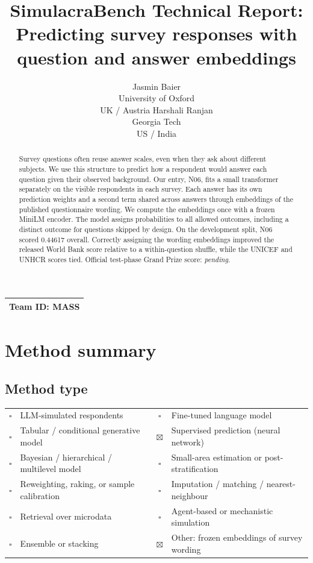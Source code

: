 \documentclass{article}
\title{SimulacraBench Technical Report:\\Predicting survey responses with\\question and answer embeddings}
\author{Jasmin Baier\\University of Oxford\\UK / Austria
\And Harshali Ranjan\\Georgia Tech\\US / India}
\newcommand{\teamid}{MASS}
\newcommand{\pending}{\textit{pending}}
\newcommand{\TestGrand}{\pending}
\newcommand{\yes}{$\boxtimes$}
\newcommand{\no}{$\square$}
\begin{document}
\maketitle
\begin{center}
\begin{tabular}{l}\toprule \textbf{Team ID:} \teamid\\\bottomrule\end{tabular}
\end{center}

\begin{abstract}
Survey questions often reuse answer scales, even when they ask about different subjects. We use this structure to predict how a respondent would answer each question given their observed background. Our entry, N06, fits a small transformer separately on the visible respondents in each survey. Each answer has its own prediction weights and a second term shared across answers through embeddings of the published questionnaire wording. We compute the embeddings once with a frozen MiniLM encoder. The model assigns probabilities to all allowed outcomes, including a distinct outcome for questions skipped by design. On the development split, N06 scored 0.44617 overall. Correctly assigning the wording embeddings improved the released World Bank score relative to a within-question shuffle, while the UNICEF and UNHCR scores tied. Official test-phase Grand Prize score: \TestGrand.
\end{abstract}

\section{Method summary}
\subsection{Method type}
\begin{center}\small
\begin{tabularx}{\linewidth}{@{}cYcY@{}}
\toprule
\no & LLM-simulated respondents & \no & Fine-tuned language model\\
\no & Tabular / conditional generative model & \yes & Supervised prediction (neural network)\\
\no & Bayesian / hierarchical / multilevel model & \no & Small-area estimation or post-stratification\\
\no & Reweighting, raking, or sample calibration & \no & Imputation / matching / nearest-neighbour\\
\no & Retrieval over microdata & \no & Agent-based or mechanistic simulation\\
\no & Ensemble or stacking & \yes & Other: frozen embeddings of survey wording\\
\bottomrule
\end{tabularx}\end{center}
\end{document}

